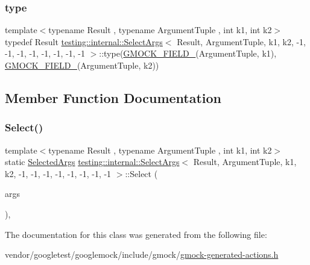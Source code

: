 \subsubsection{\texorpdfstring{type}{type}}
{\footnotesize\ttfamily template$<$typename Result , typename Argument\+Tuple , int k1, int k2$>$ \\
typedef Result \hyperlink{classtesting_1_1internal_1_1_select_args}{testing\+::internal\+::\+Select\+Args}$<$ Result, Argument\+Tuple, k1, k2, -\/1, -\/1, -\/1, -\/1, -\/1, -\/1, -\/1, -\/1 $>$\+::type(\hyperlink{gmock-generated-actions_8h_a6eb3ce92b0613603057a20ec9e593317}{G\+M\+O\+C\+K\+\_\+\+F\+I\+E\+L\+D\+\_\+}(Argument\+Tuple, k1), \hyperlink{gmock-generated-actions_8h_a6eb3ce92b0613603057a20ec9e593317}{G\+M\+O\+C\+K\+\_\+\+F\+I\+E\+L\+D\+\_\+}(Argument\+Tuple, k2))}



\subsection{Member Function Documentation}
\mbox{\label{classtesting_1_1internal_1_1_select_args_3_01_result_00_01_argument_tuple_00_01k1_00_01k2_00_01-03e4fb75e6504ae34fdb48d64bb6de95_ab9239ba0c8afd6d36332fe5f65f12e5a}} 
\subsubsection{\texorpdfstring{Select()}{Select()}}
{\footnotesize\ttfamily template$<$typename Result , typename Argument\+Tuple , int k1, int k2$>$ \\
static \hyperlink{classtesting_1_1internal_1_1_select_args_3_01_result_00_01_argument_tuple_00_01k1_00_01k2_00_01-03e4fb75e6504ae34fdb48d64bb6de95_a38c94bd44f857c5e1d4136f7a283e3e1}{Selected\+Args} \hyperlink{classtesting_1_1internal_1_1_select_args}{testing\+::internal\+::\+Select\+Args}$<$ Result, Argument\+Tuple, k1, k2, -\/1, -\/1, -\/1, -\/1, -\/1, -\/1, -\/1, -\/1 $>$\+::Select (\begin{DoxyParamCaption}\item[{const Argument\+Tuple \&}]{args }\end{DoxyParamCaption})\hspace{0.3cm}{\ttfamily [inline]}, {\ttfamily [static]}}



The documentation for this class was generated from the following file\+:\begin{DoxyCompactItemize}
\item 
vendor/googletest/googlemock/include/gmock/\hyperlink{gmock-generated-actions_8h}{gmock-\/generated-\/actions.\+h}\end{DoxyCompactItemize}
